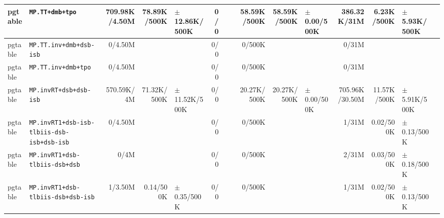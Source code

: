 \begin{tabular}{l l  | r r l | r r l | r r l | r r l l}
         pgtable &                                       \verb|MP.TT+dmb+tpo| &  709.98K/4.50M &           78.89K/500K & $\pm$ 12.86K/500K &            0/0 &                       &                 &    58.59K/500K &           58.59K/500K &   $\pm$ 0.00/500K &    386.32K/31M &            6.23K/500K &  $\pm$ 5.93K/500K & \\ \hline 
         pgtable &                               \verb|MP.TT.inv+dmb+dsb-isb| &        0/4.50M &                       &                   &            0/0 &                       &                 &         0/500K &                       &                   &          0/31M &                       &                   & \\ \hline 
         pgtable &                                   \verb|MP.TT.inv+dmb+tpo| &        0/4.50M &                       &                   &            0/0 &                       &                 &         0/500K &                       &                   &          0/31M &                       &                   & \\ \hline 
         pgtable &                                \verb|MP.invRT+dsb+dsb-isb| &     570.59K/4M &           71.32K/500K & $\pm$ 11.52K/500K &            0/0 &                       &                 &    20.27K/500K &           20.27K/500K &   $\pm$ 0.00/500K & 705.96K/30.50M &           11.57K/500K &  $\pm$ 5.91K/500K & \\ \hline 
         pgtable &            \verb|MP.invRT1+dsb-isb-tlbiis-dsb-isb+dsb-isb| &        0/4.50M &                       &                   &            0/0 &                       &                 &         0/500K &                       &                   &          1/31M &             0.02/500K &   $\pm$ 0.13/500K & \\ \hline 
         pgtable &                        \verb|MP.invRT1+dsb-tlbiis-dsb+dsb| &           0/4M &                       &                   &            0/0 &                       &                 &         0/500K &                       &                   &          2/31M &             0.03/500K &   $\pm$ 0.18/500K & \\ \hline 
         pgtable &                    \verb|MP.invRT1+dsb-tlbiis-dsb+dsb-isb| &        1/3.50M &             0.14/500K &   $\pm$ 0.35/500K &            0/0 &                       &                 &         0/500K &                       &                   &          1/31M &             0.02/500K &   $\pm$ 0.13/500K & \\ \hline 

\end{tabular}
